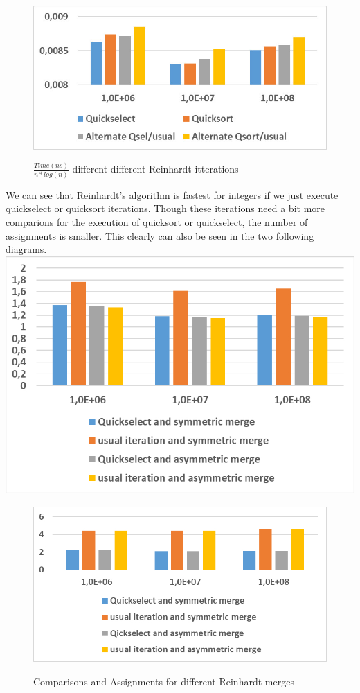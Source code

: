 \documentclass[11pt,pdftex,a4paper, twocolumn]{article}
\begin{document}
\begin{figure}[H]
\includegraphics[width=\linewidth]{Diagramm-Bilder/diff-iterations-time.JPG} \\
\caption{ $ \frac{Time(ns)}{n*log(n)} $ different different Reinhardt itterations } \label{fig:diff-iterations-time}
\end{figure}
We can see that Reinhardt’s algorithm is fastest for integers if we just execute quickselect or quicksort iterations. Though these iterations need a bit more comparions for the execution of quicksort or quickselect, the number of assignments is smaller. This clearly can also be seen in the two following diagrams. \\
\includegraphics[width=\linewidth]{Diagramm-Bilder/diff-iterationsAndMerges-comparisons.JPG} \\
\begin{figure}[H]
\includegraphics[width=\linewidth]{Diagramm-Bilder/diff-iterationsAndMerges-assignments.JPG} \\
\caption{Comparisons and Assignments for different Reinhardt merges} \label{fig:diff-iterationsAndMerges-assignAndComp}
\end{figure}
\end{document}
